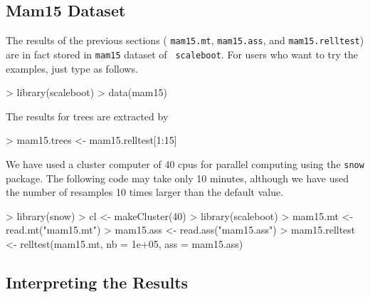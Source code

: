 \documentclass[a4paper]{amsart}
\begin{document}
\subsection{Mam15 Dataset}

The results of the previous sections (
{\tt mam15.mt}, {\tt mam15.ass}, and
{\tt mam15.relltest}) are in fact stored in {\tt mam15} dataset of {\tt
scaleboot}. For users who want to try the examples, just type as follows.
\begin{Schunk}
\begin{Sinput}
> library(scaleboot)
> data(mam15)
\end{Sinput}
\end{Schunk}

The results for trees are extracted by
\begin{Schunk}
\begin{Sinput}
> mam15.trees <- mam15.relltest[1:15]
\end{Sinput}
\end{Schunk}

We have used a cluster computer of 40 cpus for parallel computing
using the {\tt snow} package.  The following code may take only 10
minutes, although we have used the number of resamples 10 times
larger than the default value.
\begin{Schunk}
\begin{Sinput}
> library(snow)
> cl <- makeCluster(40)
> library(scaleboot)
> mam15.mt <- read.mt("mam15.mt")
> mam15.ass <- read.ass("mam15.ass")
> mam15.relltest <- relltest(mam15.mt, nb = 1e+05, ass = mam15.ass)
\end{Sinput}
\end{Schunk}

\subsection{Interpreting the Results}
\end{document}
